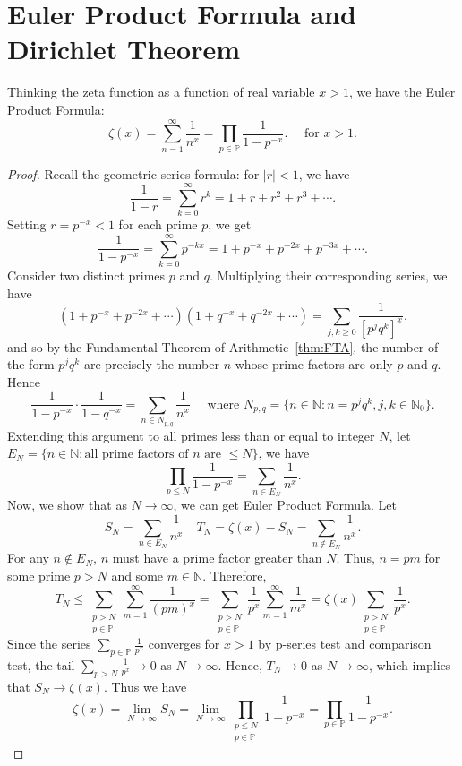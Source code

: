 \documentclass{elegantbook}
\begin{document}
\section{Euler Product Formula and Dirichlet Theorem}

\begin{theorem} \label{thm:Euler_product}
  Thinking the zeta function as a function of real variable $x > 1$, we have the Euler Product Formula:
  \[
    \zeta(x) = \sum_{n=1}^{\infty} \frac{1}{n^x} = \prod_{p \in \mathbb{P}} \frac{1}{1 - p^{-x}}. \quad \text{ for } x > 1.
  \]
\end{theorem}

\begin{proof}
  Recall the geometric series formula: for $|r| < 1$, we have
  \[
    \frac{1}{1 - r} = \sum_{k=0}^{\infty} r^k= 1 + r + r^2 + r^3 + \cdots.
  \]
  Setting $r = p^{-x}< 1$ for each prime $p$, we get
  \[
    \frac{1}{1 - p^{-x}} = \sum_{k=0}^{\infty} p^{-kx}= 1 + p^{-x} + p^{-2x} + p^{-3x} + \cdots.
  \]
  Consider two distinct primes $p$ and $q$. Multiplying their corresponding series, we have
  \[
    (1 + p^{-x} + p^{-2x} + \cdots)(1 + q^{-x} + q^{-2x} + \cdots) = \sum_{j,k\geq0} \frac{1}{[p^j q^k]^x}.
  \]
  and so by the Fundamental Theorem of Arithmetic~\ref{thm:FTA}, the number of the form $p^j q^k$ are precisely the number $n$ whose prime factors are only $p$ and $q$. Hence
  \[
    \frac{1}{1 - p^{-x}} \cdot \frac{1}{1 - q^{-x}} = \sum_{n\in N_{p,q}} \frac{1}{n^x} \quad \text{ where } N_{p,q} = \{n \in \mathbb{N}: n=p^j q^k, j,k \in \mathbb{N}_0\}.
  \]
  Extending this argument to all primes less than or equal to integer $N$, let $E_N=\{n\in\mathbb{N}: \text{all prime factors of } n \text{ are } \leq N\}$, we have
  \[
    \prod_{p \leq N} \frac{1}{1 - p^{-x}} = \sum_{n \in E_N} \frac{1}{n^x}.
  \]
  Now, we show that as $N \to \infty$, we can get Euler Product Formula. Let
  \[
    S_N = \sum_{n \in E_N} \frac{1}{n^x} \quad T_N = \zeta(x) - S_N = \sum_{n \notin E_N} \frac{1}{n^x}.
  \]
  For any $n \notin E_N$, $n$ must have a prime factor greater than $N$. Thus, $n=pm$ for some prime $p > N$ and some $m \in \mathbb{N}$. Therefore,
  \[
    T_N \leq \sum_{\substack{p > N \\ p \in \mathbb{P}}} \sum_{m=1}^{\infty} \frac{1}{(pm)^x} = \sum_{\substack{p > N \\ p \in \mathbb{P}}} \frac{1}{p^x} \sum_{m=1}^{\infty} \frac{1}{m^x} = \zeta(x) \sum_{\substack{p > N \\ p \in \mathbb{P}}} \frac{1}{p^x}.
  \]
  Since the series $\sum_{p \in \mathbb{P}} \frac{1}{p^x}$ converges for $x > 1$ by p-series test and comparison test, the tail $\sum_{p > N} \frac{1}{p^x} \to 0$ as $N \to \infty$. Hence, $T_N \to 0$ as $N \to \infty$, which implies that $S_N \to \zeta(x)$. Thus we have
  \[
    \zeta(x) = \lim_{N \to \infty} S_N = \lim_{N \to \infty} \prod_{\substack{p \leq N \\ p \in \mathbb{P}}} \frac{1}{1 - p^{-x}} = \prod_{p \in \mathbb{P}} \frac{1}{1 - p^{-x}}.
  \]
\end{proof}
\end{document}
